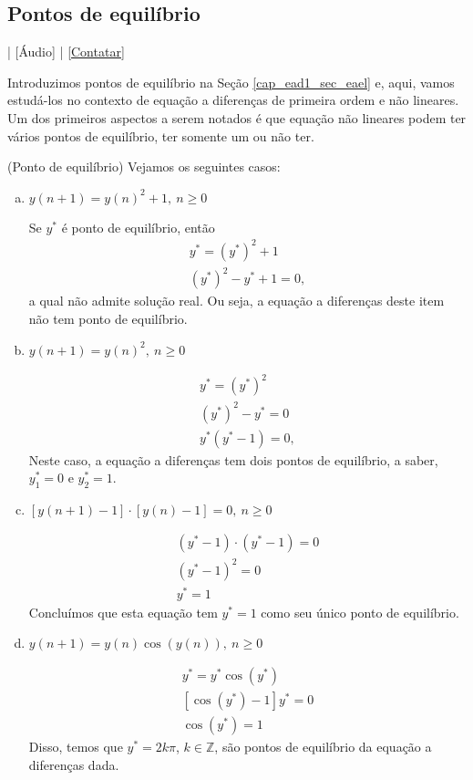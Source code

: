 \subsection{Pontos de equilíbrio}

\begin{flushright}
  [Vídeo] | [Áudio] | \href{https://phkonzen.github.io/notas/contato.html}{[Contatar]}
\end{flushright}

Introduzimos pontos de equilíbrio na Seção \ref{cap_ead1_sec_eael} e, aqui, vamos estudá-los no contexto de equação a diferenças de primeira ordem e não lineares. Um dos primeiros aspectos a serem notados é que equação não lineares podem ter vários pontos de equilíbrio, ter somente um ou não ter.

\begin{ex}(Ponto de equilíbrio)
  Vejamos os seguintes casos:
  \begin{enumerate}[a)]
  \item $y(n+1) = y(n)^2+1,~n\geq 0$

    Se $y^*$ é ponto de equilíbrio, então
    \begin{gather}
      y^* = \left(y^*\right)^2 + 1 \\
      \left(y^*\right)^2 - y^* + 1 = 0,
    \end{gather}
    a qual não admite solução real. Ou seja, a equação a diferenças deste item não tem ponto de equilíbrio.

  \item $y(n+1) = y(n)^2,~n\geq 0$

    \begin{gather}
      y^* = \left(y^*\right)^2 \\
      \left(y^*\right)^2 - y^* = 0 \\
      y^*\left(y^* - 1\right) = 0,
    \end{gather}
    Neste caso, a equação a diferenças tem dois pontos de equilíbrio, a saber, $y_1^* = 0$ e $y_2^* = 1$.

  \item $\left[y(n+1)-1\right]\cdot \left[y(n)-1\right]=0,~n\geq 0$

    \begin{gather}
      \left(y^*-1\right)\cdot \left(y^*-1\right) = 0 \\
      \left(y^*-1\right)^2 = 0 \\
      y^* = 1
    \end{gather}
    Concluímos que esta equação tem $y^*=1$ como seu único ponto de equilíbrio.

  \item $y(n+1) = y(n)\cos\left(y(n)\right), ~ n\geq 0$

    \begin{gather}
      y^* = y^*\cos\left(y^*\right) \\
      \left[\cos\left(y^*\right) - 1\right]y^* = 0 \\
      \cos\left(y^*\right) = 1
    \end{gather}
    Disso, temos que $y^* = 2k\pi$, $k\in\mathbb{Z}$, são pontos de equilíbrio da equação a diferenças dada. 
  \end{enumerate}
\end{ex}


